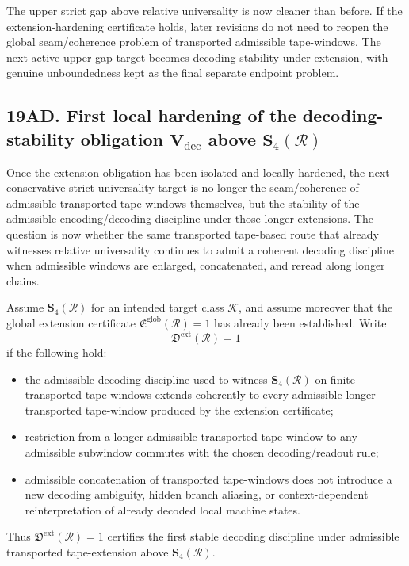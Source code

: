 \begin{corollary}
The upper strict gap above relative universality is now cleaner than before. If the extension-hardening certificate holds, later revisions do not need to reopen the global seam/coherence problem of transported admissible tape-windows. The next active upper-gap target becomes decoding stability under extension, with genuine unboundedness kept as the final separate endpoint problem.
\end{corollary}


\subsection*{19AD. First local hardening of the decoding-stability obligation \(\mathbf V_{\mathrm{dec}}\) above \(\mathbf S_4(\mathcal R)\)}
Once the extension obligation has been isolated and locally hardened, the next conservative strict-universality target is no longer the seam/coherence of admissible transported tape-windows themselves, but the stability of the admissible encoding/decoding discipline under those longer extensions. The question is now whether the same transported tape-based route that already witnesses relative universality continues to admit a coherent decoding discipline when admissible windows are enlarged, concatenated, and reread along longer chains.

\begin{definition}
Assume \(\mathbf S_4(\mathcal R)\) for an intended target class \(\mathcal K\), and assume moreover that the global extension certificate \(\mathfrak E^{\mathrm{glob}}(\mathcal R)=1\) has already been established.
Write
\[
\mathfrak D^{\mathrm{ext}}(\mathcal R)=1
\]
if the following hold:
\begin{itemize}[leftmargin=2em]
  \item the admissible decoding discipline used to witness \(\mathbf S_4(\mathcal R)\) on finite transported tape-windows extends coherently to every admissible longer transported tape-window produced by the extension certificate;
  \item restriction from a longer admissible transported tape-window to any admissible subwindow commutes with the chosen decoding/readout rule;
  \item admissible concatenation of transported tape-windows does not introduce a new decoding ambiguity, hidden branch aliasing, or context-dependent reinterpretation of already decoded local machine states.
\end{itemize}
Thus \(\mathfrak D^{\mathrm{ext}}(\mathcal R)=1\) certifies the first stable decoding discipline under admissible transported tape-extension above \(\mathbf S_4(\mathcal R)\).
\end{definition}

